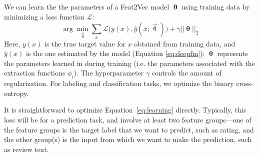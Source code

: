\documentclass{article}
\newcommand{\vect}[1]{\vec{#1}}
\renewcommand{\cite}[1]{\citep{#1}}
\begin{document}
We can learn the the parameters of a Feat2Vec model $ \bm\uptheta$ using training data by minimizing a loss function $\mathcal L$:
\label{sec:learning}
\begin{equation}
\arg \min_{\vect{\uptheta}} \sum_x  \mathcal{L}\bigl(  y(x), \hat y(x;\vect{\uptheta})\bigr) + \gamma ||  \bm{\uptheta}||_{2}
\label{eq:learning}
\end{equation}
Here, $y(x)$  is the true target value for $x$ obtained from training data, and $\hat{y}(x)$ is the one estimated by the model (Equation \ref{eq:deepfm});
$\bm\uptheta$ represents the parameters learned in during training (i.e. the parameters associated with the extraction functions $\phi_i$).
The hyperparameter $\gamma$ controls the amount of regularization.
For labeling and classification tasks, we optimize the binary cross-entropy.



It is straightforward to optimize Equation~\ref{eq:learning} directly.
Typically, this loss will be for a prediction task, and involve at least two feature groups---one of the feature groups is the target label that we want to predict, such as rating, and the other group(s) is the input from which we want to make the prediction, such as review text.
\end{document}

